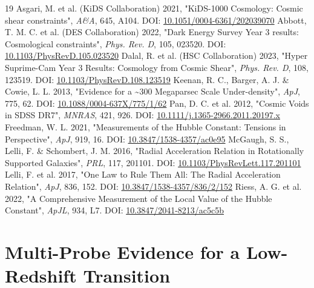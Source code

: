 \documentclass[11pt,a4paper]{article}
\begin{document}
\begin{thebibliography}{19}
 Asgari, M. et al. (KiDS Collaboration) 2021, "KiDS-1000 Cosmology: Cosmic shear constraints", \emph{A\&A}, 645, A104. DOI: \href{https://doi.org/10.1051/0004-6361/202039070}{10.1051/\allowbreak{}0004-6361/\allowbreak{}202039070}
 Abbott, T. M. C. et al. (DES Collaboration) 2022, "Dark Energy Survey Year 3 results: Cosmological constraints", \emph{Phys. Rev. D}, 105, 023520. DOI: \href{https://doi.org/10.1103/PhysRevD.105.023520}{10.1103/\allowbreak{}PhysRevD.105.023520}
 Dalal, R. et al. (HSC Collaboration) 2023, "Hyper Suprime-Cam Year 3 Results: Cosmology from Cosmic Shear", \emph{Phys. Rev. D}, 108, 123519. DOI: \href{https://doi.org/10.1103/PhysRevD.108.123519}{10.1103/\allowbreak{}PhysRevD.108.123519}
 Keenan, R. C., Barger, A. J. \& Cowie, L. L. 2013, "Evidence for a \~{}300 Megaparsec Scale Under-density", \emph{ApJ}, 775, 62. DOI: \href{https://doi.org/10.1088/0004-637X/775/1/62}{10.1088/\allowbreak{}0004-637X/\allowbreak{}775/\allowbreak{}1/\allowbreak{}62}
 Pan, D. C. et al. 2012, "Cosmic Voids in SDSS DR7", \emph{MNRAS}, 421, 926. DOI: \href{https://doi.org/10.1111/j.1365-2966.2011.20197.x}{10.1111/\allowbreak{}j.1365-2966.2011.20197.x}
 Freedman, W. L. 2021, "Measurements of the Hubble Constant: Tensions in Perspective", \emph{ApJ}, 919, 16. DOI: \href{https://doi.org/10.3847/1538-4357/ac0e95}{10.3847/\allowbreak{}1538-4357/\allowbreak{}ac0e95}
 McGaugh, S. S., Lelli, F. \& Schombert, J. M. 2016, "Radial Acceleration Relation in Rotationally Supported Galaxies", \emph{PRL}, 117, 201101. DOI: \href{https://doi.org/10.1103/PhysRevLett.117.201101}{10.1103/\allowbreak{}PhysRevLett.117.201101}
 Lelli, F. et al. 2017, "One Law to Rule Them All: The Radial Acceleration Relation", \emph{ApJ}, 836, 152. DOI: \href{https://doi.org/10.3847/1538-4357/836/2/152}{10.3847/\allowbreak{}1538-4357/\allowbreak{}836/\allowbreak{}2/\allowbreak{}152}
 Riess, A. G. et al. 2022, "A Comprehensive Measurement of the Local Value of the Hubble Constant", \emph{ApJL}, 934, L7. DOI: \href{https://doi.org/10.3847/2041-8213/ac5c5b}{10.3847/\allowbreak{}2041-8213/\allowbreak{}ac5c5b}
\end{thebibliography}



\part{Multi-Probe Evidence for a Low-Redshift Transition}
\end{document}
